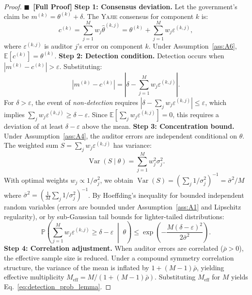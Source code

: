 \documentclass[11pt,a4paper]{article}
\theoremstyle{definition}
\newcommand{\rigorFull}[0]{$\blacksquare$~\textbf{[Full Proof]}}
\newcommand{\Yajie}{\textsc{Yajie}}
\DeclareMathOperator{\Var}{Var}
\newcommand{\E}{\mathbb{E}}
\newcommand{\Pbb}{\mathbb{P}}
\newcommand{\abs}[1]{\left|#1\right|}
\begin{document}
\begin{proof}\rigorFull
\textbf{Step 1: Consensus deviation.} Let the government's claim be $m^{(k)} = \theta^{(k)} + \delta$. The \Yajie{} consensus for component $k$ is:
\begin{equation}
    c^{(k)} = \sum_{j=1}^{M} w_j \hat{\theta}^{(k,j)} = \theta^{(k)} + \sum_{j=1}^{M} w_j \varepsilon^{(k,j)},
    \label{eq:consensus_component}
\end{equation}
where $\varepsilon^{(k,j)}$ is auditor $j$'s error on component $k$. Under Assumption~\ref{ass:A6}, $\E[c^{(k)}] = \theta^{(k)}$.
\textbf{Step 2: Detection condition.} Detection occurs when $\abs{m^{(k)} - c^{(k)}} > \varepsilon$. Substituting:
\begin{equation}
    \abs{m^{(k)} - c^{(k)}} = \abs{\delta - \sum_{j=1}^{M} w_j \varepsilon^{(k,j)}}.
    \label{eq:detection_condition}
\end{equation}
For $\delta > \varepsilon$, the event of \textit{non-detection} requires $\abs{\delta - \sum_j w_j \varepsilon^{(k,j)}} \leq \varepsilon$, which implies $\sum_j w_j \varepsilon^{(k,j)} \geq \delta - \varepsilon$. Since $\E[\sum_j w_j \varepsilon^{(k,j)}] = 0$, this requires a deviation of at least $\delta - \varepsilon$ above the mean.
\textbf{Step 3: Concentration bound.} Under Assumption~\ref{ass:A4}, the auditor errors are independent conditional on $\theta$. The weighted sum $S = \sum_j w_j \varepsilon^{(k,j)}$ has variance:
\begin{equation}
    \Var(S \mid \theta) = \sum_{j=1}^{M} w_j^2 \sigma_j^2.
    \label{eq:var_S}
\end{equation}
With optimal weights $w_j \propto 1/\sigma_j^2$, we obtain $\Var(S) = (\sum_j 1/\sigma_j^2)^{-1} = \bar{\sigma}^2 / M$ where $\bar{\sigma}^2 = (\frac{1}{M}\sum_j 1/\sigma_j^2)^{-1}$.
By Hoeffding's inequality for bounded independent random variables (errors are bounded under Assumption~\ref{ass:A1} and Lipschitz regularity), or by sub-Gaussian tail bounds for lighter-tailed distributions:
\begin{equation}
    \Pbb\left(\sum_{j=1}^{M} w_j \varepsilon^{(k,j)} \geq \delta - \varepsilon \;\middle|\; \theta\right) \leq \exp\left(-\frac{M(\delta - \varepsilon)^2}{2\bar{\sigma}^2}\right).
    \label{eq:hoeffding_bound}
\end{equation}
\textbf{Step 4: Correlation adjustment.} When auditor errors are correlated ($\bar{\rho} > 0$), the effective sample size is reduced. Under a compound symmetry correlation structure, the variance of the mean is inflated by $1 + (M-1)\bar{\rho}$, yielding effective multiplicity $M_{\mathrm{eff}} = M / (1 + (M-1)\bar{\rho})$. Substituting $M_{\mathrm{eff}}$ for $M$ yields Eq.~\eqref{eq:detection_prob_lemma}.

\end{proof}
\end{document}
